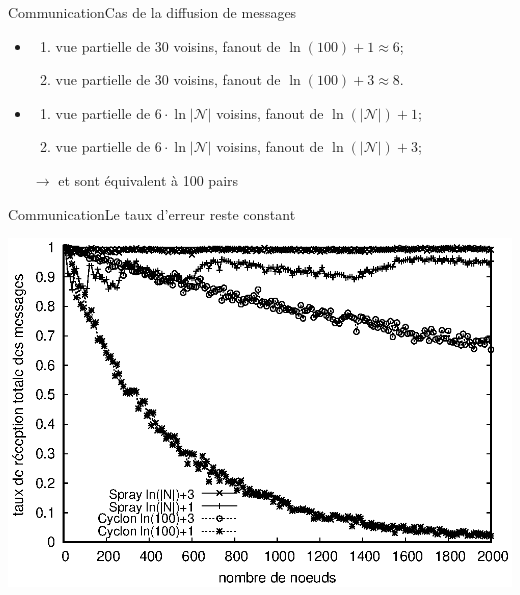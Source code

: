 \begin{frame}{Communication}{Cas de la diffusion de messages}
  \begin{algorithm}[H]
    
  \end{algorithm}

  \begin{itemize}
  \item \CYCLON 
    \begin{enumerate}
    \item vue partielle de 30 voisins, fanout de $\ln(100)+1\approx 6$;
    \item vue partielle de 30 voisins, fanout de  $\ln(100)+3 \approx 8$.
    \end{enumerate}
  \item \SPRAY
    \begin{enumerate}
    \item vue partielle de $6\cdot\ln|\mathcal{N}|$ voisins,
      fanout de $\ln(|\mathcal{N}|)+1$;
    \item vue partielle de $6\cdot\ln|\mathcal{N}|$ voisins,
      fanout de $\ln(|\mathcal{N}|)+3$;
    \end{enumerate}
  \end{itemize}


  \begin{itemize}
  \item[$\rightarrow$] \CYCLON et \SPRAY sont équivalent à 100 pairs
  \end{itemize}
\end{frame}

\begin{frame}{Communication}{Le taux d'erreur reste constant}
  \begin{center}
    \includegraphics[width=1\textwidth]{img/network/hardrate.eps}
  \end{center} 
\end{frame}

